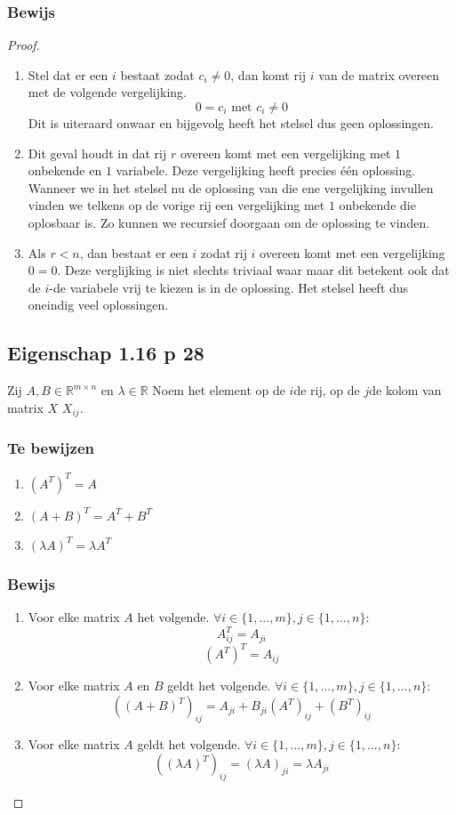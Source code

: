\documentclass[lineaire_algebra_oplossingen.tex]{subfiles}
\begin{document}
\subsubsection*{Bewijs}
\begin{proof}
\begin{enumerate}
\item Stel dat er een $i$ bestaat zodat $c_i \neq 0$, dan komt rij $i$ van de matrix overeen met de volgende vergelijking.
\[
0 = c_i \text{ met } c_i \neq 0
\]
Dit is uiteraard onwaar en bijgevolg heeft het stelsel dus geen oplossingen.
\item
Dit geval houdt in dat rij $r$ overeen komt met een vergelijking met $1$ onbekende en $1$ variabele. Deze vergelijking heeft precies \'e\'en oplossing. Wanneer we in het stelsel nu de oplossing van die ene vergelijking invullen vinden we telkens op de vorige rij een vergelijking met $1$ onbekende die oplosbaar is. Zo kunnen we recursief doorgaan om de oplossing te vinden.
\item
Als $r < n$, dan bestaat er een $i$ zodat rij $i$ overeen komt met een vergelijking $0=0$. Deze verglijking is niet slechts triviaal waar maar dit betekent ook dat de $i$-de variabele vrij te kiezen is in de oplossing. Het stelsel heeft dus oneindig veel oplossingen.
\end{enumerate}
\subsection{Eigenschap 1.16 p 28}
Zij $A,B \in \mathbb{R}^{m\times n} $ en $\lambda \in \mathbb{R}$
Noem het element op de $i$de rij, op de $j$de kolom van matrix $X$ $X_{ij}$.
\subsubsection*{Te bewijzen}
\begin{enumerate}
\item $(A^T)^T = A$
\item $(A+B)^T = A^T + B^T$
\item $(\lambda A)^T=\lambda A^T$
\end{enumerate}
\subsubsection*{Bewijs}
\begin{enumerate}
\item Voor elke matrix $A$ het volgende. $\forall i\in \{1,...,m\} ,j \in \{1,...,n\}:$
\[
A^T_{ij} = A_{ji}
\]
\[
(A^T)^T = A_{ij}
\]
\item Voor elke matrix $A$ en $B$ geldt het volgende. $\forall i\in \{1,...,m\} ,j \in \{1,...,n\}:$
\[
((A+B)^T)_{ij} = A_{ji}+B_{ji}(A^T)_{ij} + (B^T)_{ij}
\]
\item Voor elke matrix $A$ geldt het volgende. $\forall i\in \{1,...,m\} ,j \in \{1,...,n\}:$
\[
((\lambda A)^T)_{ij} = (\lambda A)_{ji} = \lambda A_{ji}
\]
\end{enumerate}
\end{proof}
\end{document}

